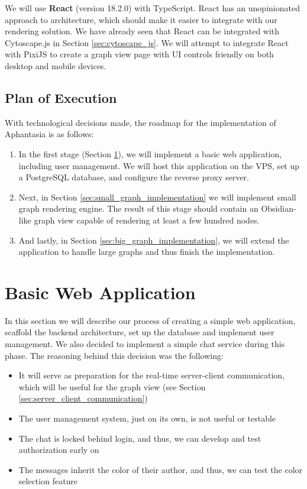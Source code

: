 We will use \textbf{React} (version 18.2.0) with TypeScript.
React has an unopinionated approach to architecture, which should make it easier to integrate with our rendering solution.
We have already seen that React can be integrated with Cytoscape.js in Section \ref{sec:cytoscape_js}.
We will attempt to integrate React with PixiJS to create a graph view page with UI controls friendly on both desktop and mobile devices.

\subsection{Plan of Execution}
With technological decisions made, the roadmap for the implementation of Aphantasia is as follows:

\begin{enumerate}
    \item In the first stage (Section \ref{sec:basic_web_app}), we will implement a basic web application, including user management.
 We will host this application on the VPS, set up a PostgreSQL database, and configure the reverse proxy server.

    \item Next, in Section \ref{sec:small_graph_implementation} we will implement small graph rendering engine. 
 The result of this stage should contain an Obsidian-like graph view capable of rendering at least a few hundred nodes.

    \item And lastly, in Section \ref{sec:big_graph_implementation}, we will extend the application to handle large graphs and thus finish the implementation.
\end{enumerate}

\section{Basic Web Application}
\label{sec:basic_web_app}
In this section we will describe our process of creating a simple web application, scaffold the backend architecture, set up the database and implement user management.
We also decided to implement a simple chat service during this phase.
The reasoning behind this decision was the following:
\begin{itemize}
    \item It will serve as preparation for the real-time server-client communication, which will be useful for the graph view
 (see Section \ref{sec:server_client_communication})
    \item The user management system, just on its own, is not useful or testable
    \item The chat is locked behind login, and thus, we can develop and test authorization early on
    \item The messages inherit the color of their author, and thus, we can test the color selection feature
\end{itemize}


